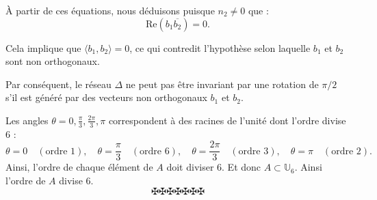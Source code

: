 {\`A} partir de ces {\'e}quations, nous d{\'e}duisons puisque $n_2 \neq 0$ que
:
\[ \mathrm{Re} (b_1 \overline{b_2}) = 0. \]


Cela implique que $\langle b_1, b_2 \rangle = 0$, ce qui contredit
l'hypoth{\`e}se selon laquelle $b_1$ et $b_2$ sont non orthogonaux.

Par cons{\'e}quent, le r{\'e}seau $\Delta$ ne peut pas {\^e}tre invariant par
une rotation de $\pi / 2$ s'il est g{\'e}n{\'e}r{\'e} par des vecteurs non
orthogonaux $b_1$ et $b_2$.

Les angles $\theta = 0, \frac{\pi}{3}, \frac{2 \pi}{3}, \pi$ correspondent
{\`a} des racines de l'unit{\'e} dont l'ordre divise 6 :
\[ \theta = 0 \quad (\text{ordre } 1), \quad \theta = \frac{\pi}{3}  \quad
   (\text{ordre } 6), \quad \theta = \frac{2 \pi}{3}  \quad (\text{ordre } 3),
   \quad \theta = \pi \quad (\text{ordre } 2) . \]
Ainsi, l'ordre de chaque {\'e}l{\'e}ment de $A$ doit diviser 6. Et donc $A
\subset \mathbb{U}_6$. Ainsi l'ordre de $A$ divise 6.
\[ \maltese \maltese \maltese \maltese \maltese \maltese \maltese \]
